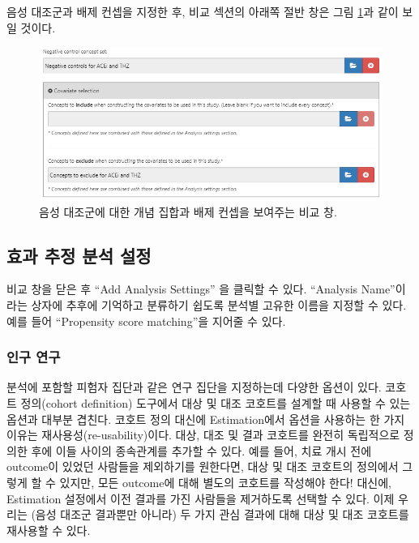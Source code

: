 \documentclass[11pt]{book}
\theoremstyle{definition}
\theoremstyle{definition}
\theoremstyle{definition}
\theoremstyle{remark}
\begin{document}
음성 대조군과 배제 컨셉을 지정한 후, 비교 섹션의 아래쪽 절반 창은 그림
\ref{fig:comparisons2}과 같이 보일 것이다.

\begin{figure}

{\centering \includegraphics[width=1\linewidth]{images/PopulationLevelEstimation/comparisons2} 

}

\caption{음성 대조군에 대한 개념 집합과 배제 컨셉을 보여주는 비교 창.}\label{fig:comparisons2}
\end{figure}

\subsection{효과 추정 분석 설정}\label{---}

비교 창을 닫은 후 ``Add Analysis Settings'' 을 클릭할 수 있다.
``Analysis Name''이라는 상자에 추후에 기억하고 분류하기 쉽도록 분석별
고유한 이름을 지정할 수 있다. 예를 들어 ``Propensity score matching''을
지어줄 수 있다.

\subsubsection*{인구 연구}\label{-}

분석에 포함할 피험자 집단과 같은 연구 집단을 지정하는데 다양한 옵션이
있다. 코호트 정의(cohort definition) 도구에서 대상 및 대조 코호트를
설계할 때 사용할 수 있는 옵션과 대부분 겹친다. 코호트 정의 대신에
Estimation에서 옵션을 사용하는 한 가지 이유는
재사용성(re-usability)이다. 대상, 대조 및 결과 코호트를 완전히
독립적으로 정의한 후에 이들 사이의 종속관계를 추가할 수 있다. 예를 들어,
치료 개시 전에 outcome이 있었던 사람들을 제외하기를 원한다면, 대상 및
대조 코호트의 정의에서 그렇게 할 수 있지만, 모든 outcome에 대해 별도의
코호트를 작성해야 한다! 대신에, Estimation 설정에서 이전 결과를 가진
사람들을 제거하도록 선택할 수 있다. 이제 우리는 (음성 대조군 결과뿐만
아니라) 두 가지 관심 결과에 대해 대상 및 대조 코호트를 재사용할 수 있다.
\end{document}
